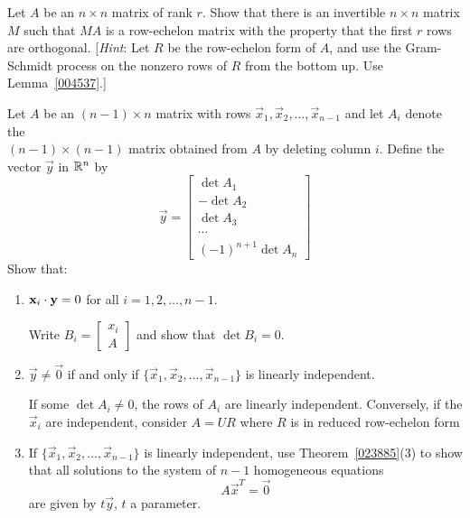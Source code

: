 \documentclass{ximera}
\begin{document}
\begin{problem}
Let $A$ be an $n \times n$ matrix of rank $r$. Show that there is an invertible $n \times n$ matrix $M$ such that $MA$ is a row-echelon matrix with the property that the first $r$ rows are orthogonal. [\textit{Hint}: Let $R$ be the row-echelon form of $A$, and use the Gram-Schmidt process on the nonzero rows of $R$ from the bottom up. Use Lemma~\ref{004537}.]
\end{problem}

\begin{problem}
Let $A$ be an $(n - 1) \times n$ matrix with rows $\vec{x}_{1}, \vec{x}_{2}, \dots, \vec{x}_{n-1}$ and let $A_{i}$ denote the \\ $(n - 1) \times (n - 1)$ matrix obtained from $A$ by deleting column $i$. Define the vector $\vec{y}$ in $\mathbb{R}^n$ by \begin{equation*}
\vec{y} = \begin{bmatrix}
\det A_{1} \\ -\det A_{2} \\ \det A_{3} \\ \cdots \\ (-1)^{n+1} \det A_{n}
\end{bmatrix}
\end{equation*} Show that:


\begin{enumerate}[label={\alph*.}]
\item $\mathbf{x}_{i} \cdot \mathbf{y} = 0$ for all $i = 1, 2, \dots , n - 1$. 
\begin{hint}
Write $B_{i} = \begin{bmatrix}
x_{i} \\ A
\end{bmatrix}$
and show that $\det B_{i} = 0$.
\end{hint}

\item $\vec{y} \neq \vec{0}$ if and only if $\{\vec{x}_{1}, \vec{x}_{2}, \dots , \vec{x}_{n-1}\}$ is linearly independent.
\begin{hint}
If some $\det A_{i} \neq 0$, the rows of $A_{i}$ are linearly independent. Conversely, if the $\vec{x}_{i}$ are independent, consider $A = UR$ where $R$ is in reduced row-echelon form
\end{hint}

\item If $\{\vec{x}_{1}, \vec{x}_{2}, \dots , \vec{x}_{n-1}\}$ is linearly independent, use Theorem~\ref{023885}(3) to show that all solutions to the system of $n - 1$ homogeneous equations
\begin{equation*}
A\vec{x}^T = \vec{0}
\end{equation*}
are given by $t\vec{y}$, $t$ a parameter.

\end{enumerate}
\end{problem}
\end{document}

